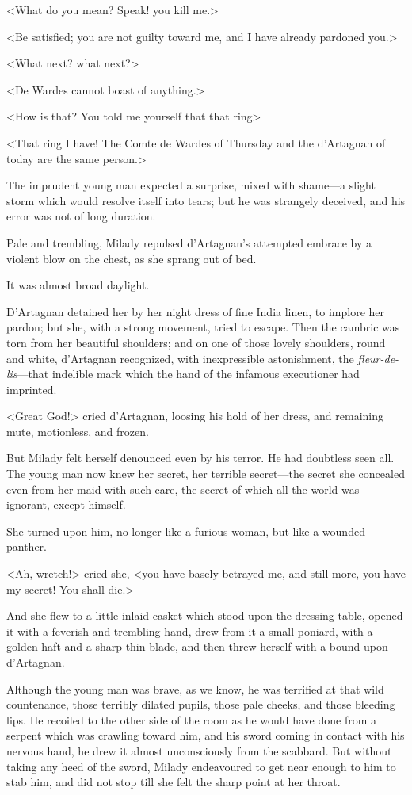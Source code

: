 <What do you mean? Speak! you kill me.> 

<Be satisfied; you are not guilty toward me, and I have already pardoned you.> 

<What next? what next?> 

<De Wardes cannot boast of anything.> 

<How is that? You told me yourself that that ring\longdash> 

<That ring I have! The Comte de Wardes of Thursday and the d'Artagnan of today are the same person.> 

The imprudent young man expected a surprise, mixed with shame---a slight storm which would resolve itself into tears; but he was strangely deceived, and his error was not of long duration. 

Pale and trembling, Milady repulsed d'Artagnan's attempted embrace by a violent blow on the chest, as she sprang out of bed. 

It was almost broad daylight. 

D'Artagnan detained her by her night dress of fine India linen, to implore her pardon; but she, with a strong movement, tried to escape. Then the cambric was torn from her beautiful shoulders; and on one of those lovely shoulders, round and white, d'Artagnan recognized, with inexpressible astonishment, the \textit{fleur-de-lis}---that indelible mark which the hand of the infamous executioner had imprinted. 

<Great God!> cried d'Artagnan, loosing his hold of her dress, and remaining mute, motionless, and frozen. 

But Milady felt herself denounced even by his terror. He had doubtless seen all. The young man now knew her secret, her terrible secret---the secret she concealed even from her maid with such care, the secret of which all the world was ignorant, except himself. 

She turned upon him, no longer like a furious woman, but like a wounded panther. 

<Ah, wretch!> cried she, <you have basely betrayed me, and still more, you have my secret! You shall die.> 

And she flew to a little inlaid casket which stood upon the dressing table, opened it with a feverish and trembling hand, drew from it a small poniard, with a golden haft and a sharp thin blade, and then threw herself with a bound upon d'Artagnan. 

Although the young man was brave, as we know, he was terrified at that wild countenance, those terribly dilated pupils, those pale cheeks, and those bleeding lips. He recoiled to the other side of the room as he would have done from a serpent which was crawling toward him, and his sword coming in contact with his nervous hand, he drew it almost unconsciously from the scabbard. But without taking any heed of the sword, Milady endeavoured to get near enough to him to stab him, and did not stop till she felt the sharp point at her throat. 

